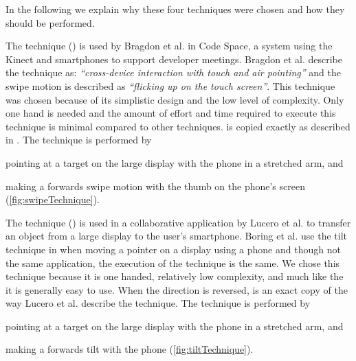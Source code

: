 In the following we explain why these four techniques were chosen and how they should be performed.

The \swipe technique () is used by Bragdon et al. \cite{Bragdon:2011} in Code Space, a system using the Kinect and smartphones to support developer meetings. 
Bragdon et al. describe the technique as: \emph{``cross-device interaction with touch and air pointing''} and the swipe motion is described as \emph{``flicking up on the touch screen''}. 
This technique was chosen because of its simplistic design and the low level of complexity.
Only one hand is needed and the amount of effort and time required to execute this technique is minimal compared to other techniques.
\swipe is copied exactly as described in \cite{Bragdon:2011}.
The \swipe technique is performed by 
\begin{enumerate*}[label=\itshape\roman*\upshape)]
	\item{pointing at a target on the large display with the phone in a stretched arm, and}
	\item{making a forwards swipe motion with the thumb on the phone's screen (\cref{fig:swipeTechnique}).}
\end{enumerate*}

The \tilt technique () is used in a collaborative application by Lucero et al. \cite{Lucero:2012} to transfer an object from a large display to the user's smartphone.
Boring et al. use the tilt technique in \cite{Boring:2009} when moving a pointer on a display using a phone and though not the same application, the execution of the technique is the same.
We chose this technique because it is one handed, relatively low complexity, and much like the \swipe it is generally easy to use.
When the direction is reversed, \tilt is an exact copy of the way Lucero et al. describe the technique.
The \tilt technique is performed by 
\begin{enumerate*}[label=\itshape\roman*\upshape)]
	\item{pointing at a target on the large display with the phone in a stretched arm, and}
	\item{making a forwards tilt with the phone (\cref{fig:tiltTechnique}).}
\end{enumerate*}


